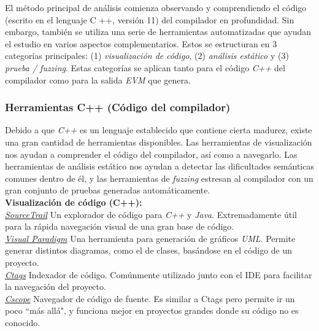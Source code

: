 El método principal de análisis comienza observando y comprendiendo el código (escrito en el lenguaje C ++, versión 11) del compilador en profundidad. Sin embargo, también se utiliza una serie de herramientas automatizadas que ayudan el estudio en varios aspectos complementarios. Estos se estructuran en 3 categorías principales: (1) \textit{visualización de código}, (2) \textit{análisis estático} y (3) \textit{prueba / fuzzing}. Estas categorías se aplican tanto para el código \textit{C++} del compilador como para la salida \textit{EVM} que genera.

\subsubsection{Herramientas C++ (Código del compilador)}

Debido a que \textit{C++} es un lenguaje establecido que contiene cierta madurez, existe una gran cantidad de herramientas disponibles. Las herramientas de visualización nos ayudan a comprender el código del compilador, así como a navegarlo. Las herramientas de análisis estático nos ayudan a detectar las dificultades semánticas comunes dentro de él, y las herramientas de \textit{fuzzing} estresan al compilador con un gran conjunto de pruebas generadas automáticamente.\\

\textbf{Visualización de código (C++):}\\

\underline{\textit{SourceTrail}}\cite{SourceTrailLink}
Un explorador de código para \textit{C++} y \textit{Java}. Extremadamente útil para la rápida navegación visual de una gran base de código.\\

\underline{\textit{Visual Paradigm}}\cite{VisualParadigmLink}
Una herramienta para generación de gráficos \textit{UML}. Permite generar distintos diagramas, como el de clases, basándose en el código de un proyecto.\\

\underline{\textit{Ctags}}\cite{CtagsLink}
Indexador de código. Comúnmente utilizado junto con el IDE para facilitar la navegación del proyecto.\\

\underline{\textit{Cscope}}\cite{CscopeLink}
Navegador de código de fuente. Es similar a Ctags pero permite ir un poco ``más allá", y funciona mejor en proyectos grandes donde su código no es conocido.\\

